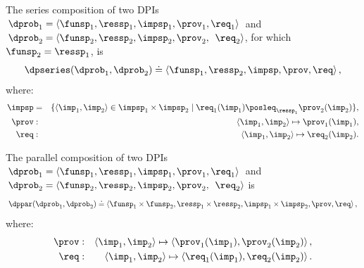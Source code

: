 \label{sec:threeoperators}
\begin{definition}[$\dpseries$]
\label{def:series-composition}The series composition of two DPIs
$\dprob_{1}=\langle\funsp_{1},\ressp_{1},\impsp_{1},\prov_{1},\req_{1}\rangle$
and $\dprob_{2}=\langle\funsp_{2},\ressp_{2},\impsp_{2},\prov_{2},$
$\req_{2}\rangle$, for which~$\funsp_{2}=\ressp_{1}$, is
\[
\dpseries(\dprob_{1},\dprob_{2})\doteq\left\langle \funsp_{1},\ressp_{2},\impsp,\prov,\req\right\rangle ,
\]
where:
\begin{eqnarray*}
\impsp & = & \{\left\langle \imp_{1},\imp_{2}\right\rangle \in\impsp_{1}\times\impsp_{2}\mid\req_{1}(\imp_{1})\posleq_{\ressp_{1}}\prov_{2}(\imp_{2})\},\\
\prov & : & \left\langle \imp_{1},\imp_{2}\right\rangle \mapsto\prov_{1}(\imp_{1}),\\
\req & : & \left\langle \imp_{1},\imp_{2}\right\rangle \mapsto\req_{2}(\imp_{2}).
\end{eqnarray*}
\end{definition}
\begin{definition}[$\dppar$]
\label{def:parallel}The parallel composition of two DPIs $\dprob_{1}=\left\langle \funsp_{1},\ressp_{1},\impsp_{1},\prov_{1},\req_{1}\right\rangle $
and $\dprob_{2}=\langle\funsp_{2},\ressp_{2},\impsp_{2},\prov_{2},$
$\req_{2}\rangle$ is
\[
\dppar(\dprob_{1},\dprob_{2})\doteq\left\langle \funsp_{1}\times\funsp_{2},\ressp_{1}\times\ressp_{2},\impsp_{1}\times\impsp_{2},\prov,\req\right\rangle ,
\]
where:
\begin{eqnarray}
\prov & : & \left\langle \imp_{1},\imp_{2}\right\rangle \mapsto\left\langle \prov_{1}(\imp_{1}),\prov_{2}(\imp_{2})\right\rangle ,\label{eq:dppar-exec}\\
\req & : & \left\langle \imp_{1},\imp_{2}\right\rangle \mapsto\left\langle \req_{1}(\imp_{1}),\req_{2}(\imp_{2})\right\rangle .\nonumber
\end{eqnarray}

\end{definition}

